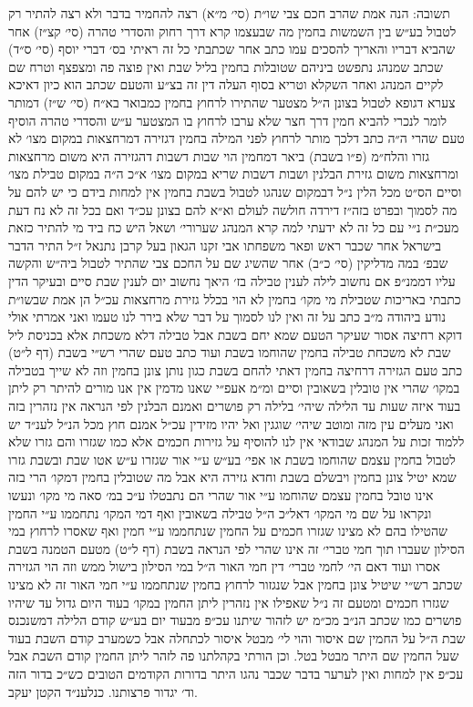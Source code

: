 \documentclass[12pt, openany]{book}
\begin{document}
\begin{multicols}{2}
תשובה: הנה אמת שהרב חכם צבי שו״ת (סי׳ מ״א) רצה להחמיר בדבר ולא רצה להתיר רק לטבול בע״ש בין השמשות בחמין מה שבעצמו קרא דרך רחוק והסדרי טהרה (סי׳ קצ״ז) אחר שהביא דבריו והאריך להסכים עמו כתב אחר שכתבתי כל זה ראיתי בס׳ דברי יוסף (סי׳ ס״ד) שכתב שמנהג נתפשט ביניהם שטובלות בחמין בליל שבת ואין פוצה פה ומצפצף וטרח שם לקיים המנהג ואחר השקלא וטריא בסוף העלה דין זה בצ״ע והטעם שכתב הוא כיון דאיכא צערא דגופא לטבול בצונן ה״ל מצטער שהתירו לרחוץ בחמין כמבואר בא״ח (סי׳ ש״ז) דמותר לומר לנכרי להביא חמין דרך חצר שלא ערבו לרחוץ בו המצטער ע״ש והסדרי טהרה הוסיף טעם שהרי ה״ה כתב דלכך מותר לרחוץ לפני המילה בחמין דגזירה דמרחצאות במקום מצו׳ לא גזרו והלח״מ (פ״ו בשבת) ביאר דמחמין הוי שבות דשבות דהגזירה היא משום מרחצאות ומרחצאות משום גזירת הבלנין ושבות דשבות שריא במקום מצו׳ א״כ ה״ה במקום טבילת מצו׳ וסיים הס״ט מכל הלין נ״ל דבמקום שנהגו לטבול בשבת בחמין אין למחות בידם כי יש להם על מה לסמוך ובפרט בזה״ז דירדה חולשה לעולם וא״א להם בצונן עכ״ד ואם בכל זה לא נח דעת מעכ״ת נ״י עם כל זה לא ידעתי למה קרא המנהג שערורי׳ ושאל היש כח ביד מי להתיר כזאת בישראל אחר שכבר ראש ופאר משפחתו אבי זקנו הגאון בעל קרבן נתנאל ז״ל התיר הדבר שבפ׳ במה מדליקין (סי׳ כ״ב) אחר שהשיג שם על החכם צבי שהתיר לטבול ביה״ש והקשה עליו דממנ״פ אם נחשוב לילה לענין טבילה בז׳ היאך נחשוב יום לענין שבת סיים ובעיקר הדין כתבתי באריכות שטבילת מי מקו׳ בחמין לא הוי בכלל גזירת מרחצאות עכ״ל הן אמת שבשו״ת נודע ביהודה מ״ב כתב על זה ואין לנו לסמוך על דבר שלא בירר לנו טעמו ואני אמרתי אולי דוקא רחיצה אסור שעיקר הטעם שמא יחם בשבת אבל טבילה דלא משכחת אלא בכניסת ליל שבת לא משכחת טבילה בחמין שהוחמו בשבת ועוד כתב טעם שהרי רש״י בשבת (דף ל״ט) כתב טעם הגזירה דרחיצה בחמין דאתי להחם בשבת כגון נותן צונן בחמין וזה לא שייך בטבילה במקו׳ שהרי אין טובלין בשאובין וסיים ומ״מ אעפ״י שאנו מדמין אין אנו מורים להיתר רק ליתן בעוד איזה שעות עד הלילה שיהי׳ בלילה רק פושרים ואמנם הבלנין לפי הנראה אין נזהרין בזה ואני מעלים עין מזה ומוטב שיהי׳ שוגגין ואל יהיו מזידין עכ״ל אמנם חוץ מכל הנ״ל לענ״ד יש ללמוד זכות על המנהג שבודאי אין לנו להוסיף על גזירות חכמים אלא כמו שגזרו והם גזרו שלא לטבול בחמין עצמם שהוחמו בשבת או אפי׳ בע״ש ע״י אור שגזרו ע״ש אטו שבת ובשבת גזרו שמא יטיל צונן בחמין ויבשלם בשבת וחדא גזירה היא אבל מה שטובלין בחמין דמקו׳ הרי בזה אינו טובל בחמין עצמם שהוחמו ע״י אור שהרי הם נתבטלו ע״כ במ׳ סאה מי מקו׳ ונעשו ונקראו על שם מי המקו׳ דאל״כ ה״ל טבילה בשאובין ואף דמי המקו׳ נתחממו ע״י החמין שהטילו בהם לא מצינו שגזרו חכמים על החמין שנתחממו ע״י חמין ואף שאסרו לרחוץ במי הסילון שעברו תוך חמי טברי׳ זה אינו שהרי לפי הנראה בשבת (דף ל״ט) מטעם הטמנה בשבת אסרו ועוד דאם הי׳ לחמי טברי׳ דין חמי האור ה״ל במי הסילון בישול ממש וזה הוי הגזירה שכתב רש״י שיטיל צונן בחמין אבל שנגזור לרחוץ בחמין שנתחממו ע״י חמי האור זה לא מצינו שגזרו חכמים ומטעם זה נ״ל שאפילו אין נזהרין ליתן החמין במקו׳ בעוד היום גדול עד שיהיו פושרים כמו שכתב הנ״ב מכ״מ יש לזהור שיתנו עכ״פ מבעוד יום בע״ש קודם הלילה דמשנכנס שבת ה״ל על החמין שם איסור והוי לי׳ מבטל איסור לכתחלה אבל כשמערב קודם השבת בעוד שעל החמין שם היתר מבטל בטל. וכן הורתי בקהלתנו פה לזהר ליתן החמין קודם השבת אבל עכ״פ אין למחות ואין לערער בדבר שכבר נהגו היתר בדורות הקודמים הטובים כש״כ בדור הזה וד׳ יגדור פרצותנו. כנלענ״ד הקטן יעקב.\\\vspace{0pt}

\end{multicols}\newpage
\end{document}

